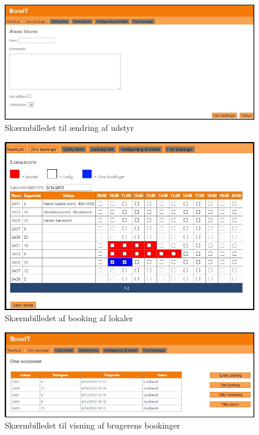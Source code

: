 \begin{figure}[h!]
  \centering
    \includegraphics[angle=90, height=0.9\textheight]{Appendix/GUI-Prototype/DigitalMockup/AendreUdstyr}
  \caption{Skærmbilledet til ændring af udstyr}
\label{App_GUI_final_AendreUdstyr}
\end{figure}

\begin{figure}[h!]
  \centering
    \includegraphics[width=\textwidth]{Appendix/GUI-Prototype/DigitalMockup/GridEksempel}
  \caption{Skærmbilledet af booking af lokaler}
\label{App_GUI_final_GridEksempel}
\end{figure}

\begin{figure}[h!]
  \centering
    \includegraphics[width=\textwidth]{Appendix/GUI-Prototype/DigitalMockup/DineBookinger}
  \caption{Skærmbilledet til visning af brugerens bookinger}
\label{App_GUI_final_DineBookinger}
\end{figure}

